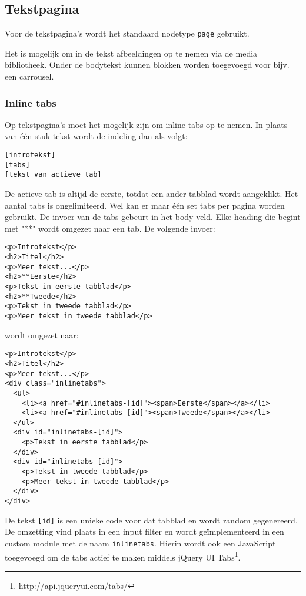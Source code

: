 \subsection{Tekstpagina}\label{tekstpagina}

Voor de tekstpagina's wordt het standaard nodetype \texttt{page} gebruikt.

Het is mogelijk om in de tekst afbeeldingen op te nemen via de media bibliotheek. Onder de bodytekst kunnen blokken worden toegevoegd voor bijv. een carrousel.

\subsubsection{Inline tabs}

Op tekstpagina's moet het mogelijk zijn om inline tabs op te nemen. In plaats van \'{e}\'{e}n stuk tekst wordt de indeling dan als volgt:
\begin{verbatim}
[introtekst]
[tabs]
[tekst van actieve tab]
\end{verbatim}
De actieve tab is altijd de eerste, totdat een ander tabblad wordt aangeklikt. Het aantal tabs is ongelimiteerd. Wel kan er maar \'{e}\'{e}n set tabs per pagina worden gebruikt.
De invoer van de tabs gebeurt in het body veld. Elke heading die begint met "**" wordt omgezet naar een tab. De volgende invoer:
\begin{verbatim}
<p>Introtekst</p>
<h2>Titel</h2>
<p>Meer tekst...</p>
<h2>**Eerste</h2>
<p>Tekst in eerste tabblad</p>
<h2>**Tweede</h2>
<p>Tekst in tweede tabblad</p>
<p>Meer tekst in tweede tabblad</p>
\end{verbatim}
wordt omgezet naar:
\begin{verbatim}
<p>Introtekst</p>
<h2>Titel</h2>
<p>Meer tekst...</p>
<div class="inlinetabs">
  <ul>
    <li><a href="#inlinetabs-[id]"><span>Eerste</span></a></li>
    <li><a href="#inlinetabs-[id]"><span>Tweede</span></a></li>
  </ul>
  <div id="inlinetabs-[id]">
    <p>Tekst in eerste tabblad</p>
  </div>
  <div id="inlinetabs-[id]">
    <p>Tekst in tweede tabblad</p>
    <p>Meer tekst in tweede tabblad</p>
  </div>
</div>
\end{verbatim}
De tekst \texttt{[id]} is een unieke code voor dat tabblad en wordt random gegenereerd. De omzetting vind plaats in een input filter en wordt ge\"{i}mplementeerd in een custom module met de naam \texttt{inlinetabs}. Hierin wordt ook een JavaScript toegevoegd om de tabs actief te maken middels jQuery UI Tabs\footnote{http://api.jqueryui.com/tabs/}.

